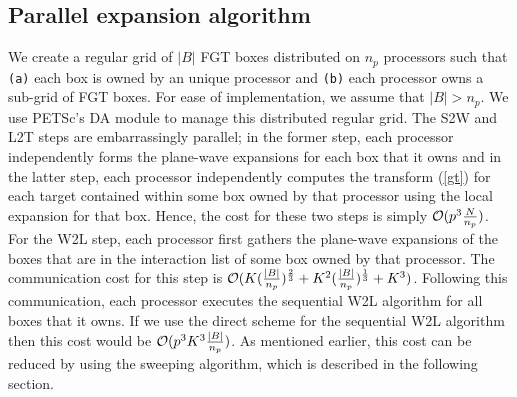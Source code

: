 \subsection{Parallel expansion algorithm} 
\label{sc:parallelExpansion}
We create a regular grid of $|B|$ FGT boxes distributed on $n_p$ processors 
such that {\tt{(a)}} each box is owned by an unique processor and {\tt{(b)}} each processor owns a 
sub-grid of FGT boxes. For ease of implementation, we assume that $|B| > n_p$. 
 We use PETSc's \cite{petsc-home-page} DA module to manage this distributed regular grid.
 The S2W and L2T steps are embarrassingly parallel; in the former step, each processor independently forms the 
 plane-wave expansions for each box that it owns and in the latter step, each processor
 independently computes the transform (\ref{gt}) for each target contained within some box owned by
  that processor using the local expansion for that box. Hence, the cost for these two steps is 
  simply $\mathcal{O}(p^3 \frac{N}{n_p})$. For the W2L step, each processor first gathers the plane-wave expansions of
  the boxes that are in the interaction list of some box owned by that processor. The communication cost for
  this step is $\mathcal{O}(K (\frac{|B|}{n_p})^{\frac{2}{3}} + K^2(\frac{|B|}{n_p})^{\frac{1}{3}} + K^3 )$.
Following this communication, each processor executes the sequential W2L algorithm for all boxes that it owns. 
 If we use the direct scheme for the sequential W2L algorithm then this cost would be $\mathcal{O}(p^3 K^3 \frac{|B|}{n_p})$.
 As mentioned earlier, this cost can be reduced by using the sweeping algorithm, which is described in the following section. 


